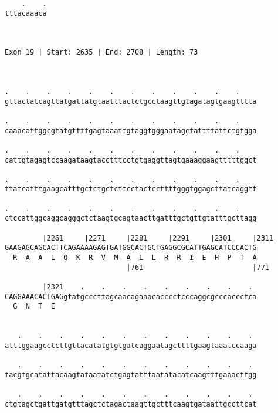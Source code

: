 \documentclass{article}
\begin{document}
\begin{Verbatim}
    .    .
tttacaaaca
          
          
 
Exon 19 | Start: 2635 | End: 2708 | Length: 73



.    .    .    .    .    .    .    .    .    .    .    .    
gttactatcagttatgattatgtaatttactctgcctaagttgtagatagtgaagtttta
                                                            
.    .    .    .    .    .    .    .    .    .    .    .    
caaacattggcgtatgttttgagtaaattgtaggtgggaatagctattttattctgtgga
                                                            
.    .    .    .    .    .    .    .    .    .    .    .    
cattgtagagtccaagataagtacctttcctgtgaggttagtgaaaggaagtttttggct
                                                            
.    .    .    .    .    .    .    .    .    .    .    .    
ttatcatttgaagcatttgctctgctcttcctactccttttgggtggagcttatcaggtt
                                                            
.    .    .    .    .    .    .    .    .    .    .    .    
ctccattggcaggcagggctctaagtgcagtaacttgatttgctgttgtatttgcttagg
                                                            
         |2261     |2271     |2281     |2291     |2301     |2311
GAAGAGCAGCACTTCAGAAAAGAGTGATGGCACTGCTGAGGCGCATTGAGCATCCCACTG
  R  A  A  L  Q  K  R  V  M  A  L  L  R  R  I  E  H  P  T  A
                             |761                          |771
  
         |2321    .    .    .    .    .    .    .    .    . 
CAGGAAACACTGAGgtatgcccttagcaacagaaacacccctcccaggcgcccaccctca
  G  N  T  E                                                
                                                            
  
   .    .    .    .    .    .    .    .    .    .    .    . 
atttggaagcctcttgttacatatgtgtgatcaggaatagcttttgaagtaaatccaaga
                                                            
   .    .    .    .    .    .    .    .    .    .    .    . 
tacgtgcatattacaagtataatatctgagtatttaatatacatcaagtttgaaacttgg
                                                            
   .    .    .    .    .    .    .    .    .    .    .    . 
ctgtagctgattgatgtttagctctagactaagttgctttcaagtgataattgccttcat
                                                            

\end{Verbatim}
\end{document}
